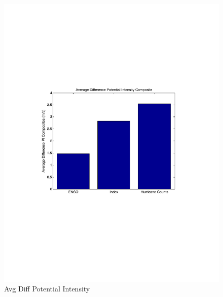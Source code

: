 \documentclass[a4paper,10pt]{article}
\begin{document}
\begin{figure}[ht]
\begin{minipage}[b]{0.6\linewidth}
\includegraphics[width=\textwidth]{figs/sensitivityResults/compositeBarGraphs/avgDiffPIAtlanticCompositesBarGraph.pdf}
\caption{Avg Diff Potential Intensity}
\label{fig:figure31}
\end{minipage}
\hspace{0cm}
\begin{minipage}[b]{0.6\linewidth}

\end{minipage}
\end{figure}
\end{document}
